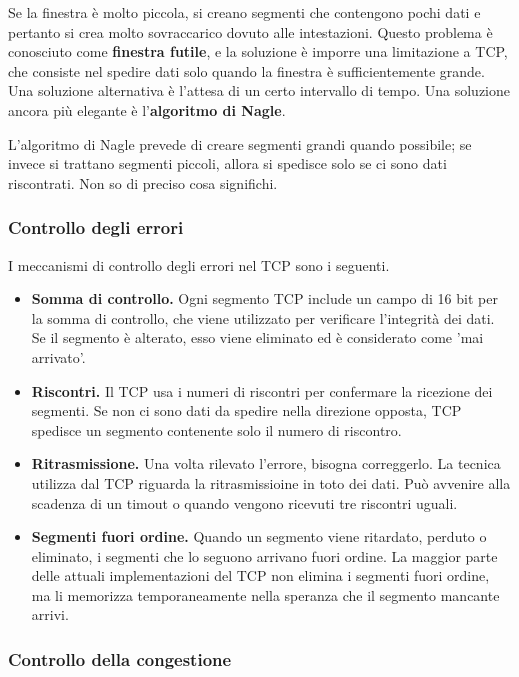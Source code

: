         \vspace{3mm}
        
        Se la finestra è molto piccola, si creano segmenti che contengono pochi dati e pertanto si crea molto sovraccarico dovuto alle intestazioni. Questo problema è conosciuto come \textbf{finestra futile}, e la soluzione è imporre una limitazione a TCP, che consiste nel spedire dati solo quando la finestra è sufficientemente grande. Una soluzione alternativa è l'attesa di un certo intervallo di tempo. Una soluzione ancora più elegante è l'\textbf{algoritmo di Nagle}.
        
        \vspace{3mm}
        
        L'algoritmo di Nagle prevede di creare segmenti grandi quando possibile; se invece si trattano segmenti piccoli, allora si spedisce solo se ci sono dati riscontrati. Non so di preciso cosa significhi.
        
    \subsubsection{Controllo degli errori}
    
        I meccanismi di controllo degli errori nel TCP sono i seguenti.
        
        \begin{itemize}
            \item 
                \textbf{Somma di controllo.} Ogni segmento TCP include un campo di 16 bit per la somma di controllo, che viene utilizzato per verificare l'integrità dei dati. Se il segmento è alterato, esso viene eliminato ed è considerato come 'mai arrivato'.
            \item
                \textbf{Riscontri.} Il TCP usa i numeri di riscontri per confermare la ricezione dei segmenti. Se non ci sono dati da spedire nella direzione opposta, TCP spedisce un segmento contenente solo il numero di riscontro.
                
            \item
                \textbf{Ritrasmissione.} Una volta rilevato l'errore, bisogna correggerlo. La tecnica utilizza dal TCP riguarda la ritrasmissioine in toto dei dati. Può avvenire alla scadenza di un timout o quando vengono ricevuti tre riscontri uguali. 
            
            \item
               \textbf{Segmenti fuori ordine.} Quando un segmento viene ritardato, perduto o eliminato, i segmenti che lo seguono arrivano fuori ordine. La maggior parte delle attuali implementazioni del TCP non elimina i segmenti fuori ordine, ma li memorizza temporaneamente nella speranza che il segmento mancante arrivi. 
        \end{itemize}
        
    \subsubsection{Controllo della congestione}
    
        